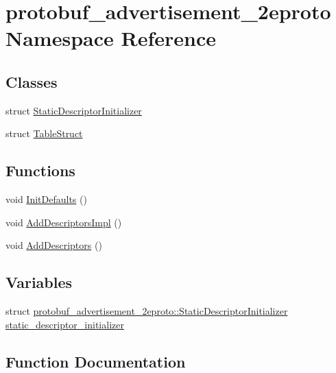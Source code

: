 \hypertarget{namespaceprotobuf__advertisement__2eproto}{}\section{protobuf\+\_\+advertisement\+\_\+2eproto Namespace Reference}
\label{namespaceprotobuf__advertisement__2eproto}
\subsection*{Classes}
\begin{DoxyCompactItemize}
\item 
struct \hyperlink{structprotobuf__advertisement__2eproto_1_1_static_descriptor_initializer}{Static\+Descriptor\+Initializer}
\item 
struct \hyperlink{structprotobuf__advertisement__2eproto_1_1_table_struct}{Table\+Struct}
\end{DoxyCompactItemize}
\subsection*{Functions}
\begin{DoxyCompactItemize}
\item 
void \hyperlink{namespaceprotobuf__advertisement__2eproto_a43e55e6ab214b404d1e5143261f05bab}{Init\+Defaults} ()
\item 
void \hyperlink{namespaceprotobuf__advertisement__2eproto_ac52f8cd71d409eadb8b7045b2c201183}{Add\+Descriptors\+Impl} ()
\item 
void \hyperlink{namespaceprotobuf__advertisement__2eproto_a00a84fff996145fee2df377fd352becf}{Add\+Descriptors} ()
\end{DoxyCompactItemize}
\subsection*{Variables}
\begin{DoxyCompactItemize}
\item 
struct \hyperlink{structprotobuf__advertisement__2eproto_1_1_static_descriptor_initializer}{protobuf\+\_\+advertisement\+\_\+2eproto\+::\+Static\+Descriptor\+Initializer} \hyperlink{namespaceprotobuf__advertisement__2eproto_afc3c0155f686268d98d8bb107c19e3fb}{static\+\_\+descriptor\+\_\+initializer}
\end{DoxyCompactItemize}


\subsection{Function Documentation}
